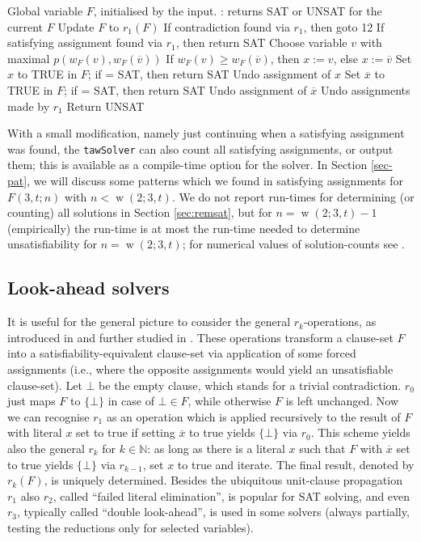 \documentclass[final,3p,times]{elsarticle}
\theoremstyle{definition}
\newcommand{\set}[1]{\{#1\}}
\newcommand{\ol}{\overline}
\newcommand{\NN}{\mathbb{N}}
\newcommand{\tawsolver}{\texttt{tawSolver}}
\DeclareMathOperator{\vdw}{w}
\begin{document}
\begin{algorithm}[H]
\caption{\tawsolver}
\begin{algorithmic}[1]
  \State Global variable $F$, initialised by the input.
   : returns SAT or UNSAT for the current $F$
  \State Update $F$ to $r_1(F)$
  \State If contradiction found via $r_1$, then goto 12
  \State If satisfying assignment found via $r_1$, then return SAT
  \State Choose variable $v$ with maximal $p(w_F(v), w_F(\ol{v}))$
  \State If $w_F(v) \ge w_F(\ol{v})$, then $x := v$, else $x := \ol{v}$
  \State Set $x$ to TRUE in $F$; if  = SAT, then return SAT
  \State Undo assignment of $x$
  \State Set $\ol{x}$ to TRUE in $F$; if  = SAT, then return SAT
  \State Undo assignment of $\ol{x}$
  \State Undo assignments made by $r_1$
  \State Return UNSAT
\EndFunction
\end{algorithmic}
\label{alg-revised-dpll}
\end{algorithm}

With a small modification, namely just continuing when a satisfying assignment was found, the \tawsolver{} can also count all satisfying assignments, or output them; this is available as a compile-time option for the solver. In Section \ref{sec-pat}, we will discuss some patterns which we found in satisfying assignments for $F(3,t;n)$ with $n < \vdw(2;3,t)$. We do not report run-times for determining (or counting) all solutions in Section \ref{sec:remsat}, but for $n=\vdw(2;3,t)-1$ (empirically) the run-time is at most the run-time needed to determine unsatisfiability for $n=\vdw(2;3,t)$; for numerical values of solution-counts see \cite{Kouril2012W34}.



\subsection{Look-ahead solvers}
\label{sec:lasolvers}

It is useful for the general picture to consider the general $r_k$-operations, as introduced in \cite{Ku99b} and further studied in \cite{GwynneKullmann2012SlurSOFSEM,GwynneKullmann2012SlurJ}. These operations transform a clause-set $F$ into a satisfiability-equivalent clause-set via application of some forced assignments (i.e., where the opposite assignments would yield an unsatisfiable clause-set). Let $\bot$ be the empty clause, which stands for a trivial contradiction. $r_0$ just maps $F$ to $\set{\bot}$ in case of $\bot \in F$, while otherwise $F$ is left unchanged. Now we can recognise $r_1$ as an operation which is applied recursively to the result of $F$ with literal $x$ set to true if setting $\ol{x}$ to true yields $\set{\bot}$ via $r_0$. This scheme yields also the general $r_k$ for $k \in \NN$: as long as there is a literal $x$ such that $F$ with $\ol{x}$ set to true yields $\set{\bot}$ via $r_{k-1}$, set $x$ to true and iterate. The final result, denoted by $r_k(F)$, is uniquely determined. Besides the ubiquitous unit-clause propagation $r_1$ also $r_2$, called ``failed literal elimination'', is popular for SAT solving, and even $r_3$, typically called ``double look-ahead'', is used in some solvers (always partially, testing the reductions only for selected variables).
\end{document}
